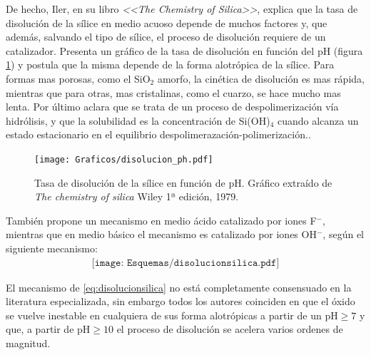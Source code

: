 	De hecho, Iler, en su libro \textit{<<The Chemistry of Silica>>}, explica que la tasa de disolución de la sílice en medio acuoso depende de muchos factores y, que además, salvando el tipo de sílice, el proceso de disolución requiere de un catalizador. Presenta un gráfico de la tasa de disolución en función del pH (figura \ref{fig:disolucion_ph}) y postula que la misma depende de la forma alotrópica de la sílice. Para formas mas porosas, como el SiO$_2$ amorfo, la cinética de disolución es mas rápida, mientras que para otras, mas cristalinas, como el cuarzo, se hace mucho mas lenta. Por último aclara que se trata de un proceso de despolimerización vía hidrólisis, y que la solubilidad es la concentración de Si(OH)$_4$ cuando alcanza un estado estacionario en el equilibrio despolimerazación-polimerización.\cite{iler1979}. 

			\begin{figure}[th!]
			    \texttt{[image: Graficos/disolucion\_ph.pdf]}
	       		\caption[Tasa de disolución sílice en función del pH]{Tasa de disolución de la sílice en función de pH. Gráfico extraído de \textit{The chemistry of silica} Wiley 1ª edición, 1979.\cite{iler1979}}
	         	\label{fig:disolucion_ph}
	     		\end{figure}
	
	También propone un mecanismo en medio ácido catalizado por iones F$^-$, mientras que en medio básico el mecanismo es catalizado por iones OH$^-$, según el siguiente mecanismo:
			\begin{equation}
				\begin{aligned}
				\texttt{[image: Esquemas/disolucionsilica.pdf]}
				\label{eq:disolucionsilica}
				\end{aligned}
				\end{equation} 
	
	El mecanismo de \ref{eq:disolucionsilica} no está completamente consensuado en la literatura especializada, sin embargo todos los autores coinciden en que el óxido se vuelve inestable en cualquiera de sus forma alotrópicas a partir de un $\text{pH}\geq7$ y que, a partir de $\text{pH}\geq10$ el proceso de disolución se acelera varios ordenes de magnitud.\cite{Kosmulski2002,Kosmulski2014,Schwarz1984,Si-HanWu2013,iler1979}

	
